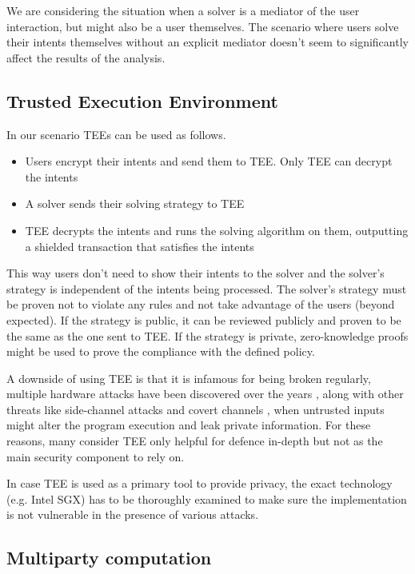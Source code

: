 \documentclass[
    9pt,            %
    report,        %
    affiltop,       %
]{art}
\begin{document}
We are considering the situation when a solver is a mediator of the user interaction, but might also be a user themselves. The scenario where users solve their intents themselves without an explicit mediator doesn't seem to significantly affect the results of the analysis.

\subsection{Trusted Execution Environment}

In our scenario TEEs can be used as follows.
\begin{itemize}
    \item Users encrypt their intents and send them to TEE. Only TEE can decrypt the intents
    \item A solver sends their solving strategy to TEE
    \item TEE decrypts the intents and runs the solving algorithm on them, outputting a shielded transaction that satisfies the intents
\end{itemize}

This way users don't need to show their intents to the solver and the solver's strategy is independent of the intents being processed. The solver's strategy must be proven not to violate any rules and not take advantage of the users (beyond expected). If the strategy is public, it can be reviewed publicly and proven to be the same as the one sent to TEE. If the strategy is private, zero-knowledge proofs might be used to prove the compliance with the defined policy.

\hfill

A downside of using TEE is that it is infamous for being broken regularly, multiple hardware attacks have been discovered over the years \cite{sgxfail} \cite{downfall}, along with other threats like side-channel attacks and covert channels \cite{flash}, when untrusted inputs might alter the program execution and leak private information. For these reasons, many consider TEE only helpful for defence in-depth but not as the main security component to rely on.

In case TEE is used as a primary tool to provide privacy, the exact technology (e.g. Intel SGX) has to be thoroughly examined to make sure the implementation is not vulnerable in the presence of various attacks.

\subsection{Multiparty computation}
\end{document}
